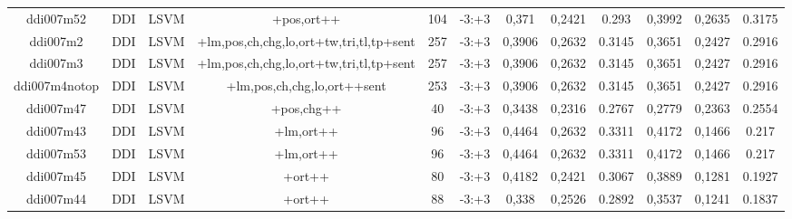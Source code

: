 \documentclass[a4paper]{article}
\begin{document}
\begin{landscape}
\begin{center}
\begin{tabular}{ |c|c|c|c|c|c|c|c|c|c|c|c|}
 
 	
 	\small{ ddi007m52 } & \small{ DDI} & \small{  LSVM }  & +pos,ort++  &  104 &  \small{  -3:+3 }  &  0,371 & 0,2421 & 0.293  &  0,3992 & 0,2635 & 0.3175 \\
 	

 
 	
 	\small{ ddi007m2 } & \small{ DDI} & \small{  LSVM }  & +lm,pos,ch,chg,lo,ort+tw,tri,tl,tp+sent  &  257 &  \small{  -3:+3 }  &  0,3906 & 0,2632 & 0.3145  &  0,3651 & 0,2427 & 0.2916 \\
 	

 
 	
 	\small{ ddi007m3 } & \small{ DDI} & \small{  LSVM }  & +lm,pos,ch,chg,lo,ort+tw,tri,tl,tp+sent  &  257 &  \small{  -3:+3 }  &  0,3906 & 0,2632 & 0.3145  &  0,3651 & 0,2427 & 0.2916 \\
 	

 
 	
 	\small{ ddi007m4notop } & \small{ DDI} & \small{  LSVM }  & +lm,pos,ch,chg,lo,ort++sent  &  253 &  \small{  -3:+3 }  &  0,3906 & 0,2632 & 0.3145  &  0,3651 & 0,2427 & 0.2916 \\
 	

 
 	
 	\small{ ddi007m47 } & \small{ DDI} & \small{  LSVM }  & +pos,chg++  &  40 &  \small{  -3:+3 }  &  0,3438 & 0,2316 & 0.2767  &  0,2779 & 0,2363 & 0.2554 \\
 	

 
 	
 	\small{ ddi007m43 } & \small{ DDI} & \small{  LSVM }  & +lm,ort++  &  96 &  \small{  -3:+3 }  &  0,4464 & 0,2632 & 0.3311  &  0,4172 & 0,1466 & 0.217 \\
 	

 
 	
 	\small{ ddi007m53 } & \small{ DDI} & \small{  LSVM }  & +lm,ort++  &  96 &  \small{  -3:+3 }  &  0,4464 & 0,2632 & 0.3311  &  0,4172 & 0,1466 & 0.217 \\
 	

 
 	
 	\small{ ddi007m45 } & \small{ DDI} & \small{  LSVM }  & +ort++  &  80 &  \small{  -3:+3 }  &  0,4182 & 0,2421 & 0.3067  &  0,3889 & 0,1281 & 0.1927 \\
 	

 
 	
 	\small{ ddi007m44 } & \small{ DDI} & \small{  LSVM }  & +ort++  &  88 &  \small{  -3:+3 }  &  0,338 & 0,2526 & 0.2892  &  0,3537 & 0,1241 & 0.1837 \\
 	
 \hline
\end{tabular}
\end{center}





\end{landscape}
\end{document}
